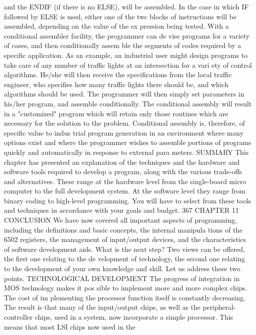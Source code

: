 {{{{{{{{{{{{{{{{{{{{{{{{{{{{{{{{{{{{{{{{{{{{{{{{{{{{{{{{{{{{{{{{{{{{{{{{{{{{{{{{{{{{{{{{{{{{{{{{{{{{{{{{{{{{{{{{{{{{{{{{{{{{{{{{{{{{{{{{{{{{and the ENDIF (if there is no ELSE), will be assembled. In the case
in which IF followed by ELSE is used, either one of the twc blocks of
instructions will be assembled, depending on the value of the ex
pression being tested.
With a conditional assembler facility, the programmer can de
vise programs for a variety of cases, and then conditionally assem
ble the segments of codes required by a specific application. As
an example, an industrial user might design programs to take
care of any number of traffic lights at an intersection for a vari
ety of control algorithms. He/she will then receive the specifications
from the local traffic engineer, who specifies how many traffic
lights there should be, and which algorithms should be used. The
programmer will then simply set parameters in his/her program, and
assemble conditionally. The conditional assembly will result in a
"customized" program which will retain only those routines
which are necessary for the solution to the problem.
Conditional assembly is, therefore, of specific value to indus
trial program generation in an environment where many options
exist and where the programmer wishes to assemble portions of
programs quickly and automatically in response to external para
meters.
SUMMARY
This chapter has presented an explanation of the techniques and the
hardware and software tools required to develop a program, along with
the various trade-offs and alternatives.
These range at the hardware level from the single-board micro
computer to the full development system. At the software level
they range from binary coding to high-level programming. You
will have to select from these tools and techniques in accordance
with your goals and budget.
367
CHAPTER 11
CONCLUSION
We have now covered all important aspects of programming,
including the definitions and basic concepts, the internal manipula
tions of the 6502 registers, the management of input/output devices,
and the characteristics of software development aids. What is the
next step? Two views can be offered, the first one relating to the de
velopment of technology, the second one relating to the development
of your own knowledge and skill. Let us address these two points.
TECHNOLOGICAL DEVELOPMENT
The progress of integration in MOS technology makes it pos
sible to implement more and more complex chips. The cost of im
plementing the processor function itself is constantly decreasing.
The result is that many of the input/output chips, as well as the
peripheral-controller chips, used in a system, now incorporate a
simple processor. This means that most LSI chips now used in the
}}}}}}}}}}}}}}}}}}}}}}}}}}}}}}}}}}}}}}}}}}}}}}}}}}}}}}}}}}}}}}}}}}}}}}}}}}}}}}}}}}}}}}}}}}}}}}}}}}}}}}}}}}}}}}}}}}}}}}}}}}}}}}}}}}}}}}}}}}}}
